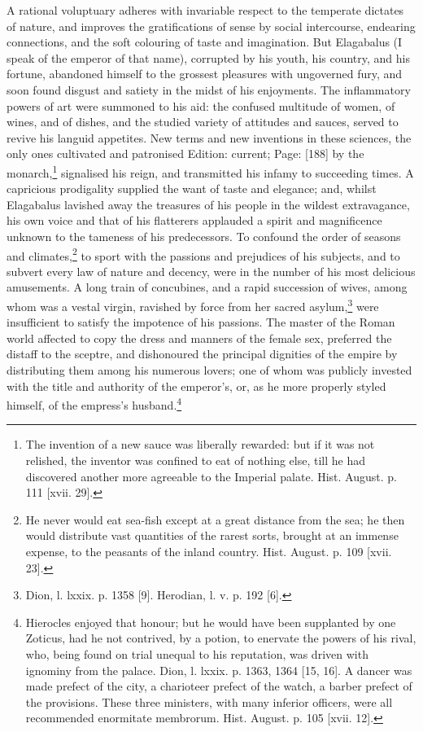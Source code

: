 A rational voluptuary adheres with invariable respect to the temperate dictates of nature, and improves the gratifications of sense by social intercourse, endearing connections, and the soft colouring of taste and imagination. But Elagabalus (I speak of the emperor of that name), corrupted by his youth, his country, and his fortune, abandoned himself to the grossest pleasures with ungoverned fury, and soon found disgust and satiety in the midst of his enjoyments. The inflammatory powers of art were summoned to his aid: the confused multitude of women, of wines, and of dishes, and the studied variety of attitudes and sauces, served to revive his languid appetites. New terms and new inventions in these sciences, the only ones cultivated and patronised Edition: current; Page: [188] by the monarch,\footnote{The invention of a new sauce was liberally rewarded: but if it was not relished, the inventor was confined to eat of nothing else, till he had discovered another more agreeable to the Imperial palate. Hist. August. p. 111 [xvii. 29].} signalised his reign, and transmitted his infamy to succeeding times. A capricious prodigality supplied the want of taste and elegance; and, whilst Elagabalus lavished away the treasures of his people in the wildest extravagance, his own voice and that of his flatterers applauded a spirit and magnificence unknown to the tameness of his predecessors. To confound the order of seasons and climates,\footnote{He never would eat sea-fish except at a great distance from the sea; he then would distribute vast quantities of the rarest sorts, brought at an immense expense, to the peasants of the inland country. Hist. August. p. 109 [xvii. 23].} to sport with the passions and prejudices of his subjects, and to subvert every law of nature and decency, were in the number of his most delicious amusements. A long train of concubines, and a rapid succession of wives, among whom was a vestal virgin, ravished by force from her sacred asylum,\footnote{Dion, l. lxxix. p. 1358 [9]. Herodian, l. v. p. 192 [6].} were insufficient to satisfy the impotence of his passions. The master of the Roman world affected to copy the dress and manners of the female sex, preferred the distaff to the sceptre, and dishonoured the principal dignities of the empire by distributing them among his numerous lovers; one of whom was publicly invested with the title and authority of the emperor\texthebrew{}’s, or, as he more properly styled himself, of the empress\texthebrew{}’s husband.\footnote{Hierocles enjoyed that honour; but he would have been supplanted by one Zoticus, had he not contrived, by a potion, to enervate the powers of his rival, who, being found on trial unequal to his reputation, was driven with ignominy from the palace. Dion, l. lxxix. p. 1363, 1364 [15, 16]. A dancer was made prefect of the city, a charioteer prefect of the watch, a barber prefect of the provisions. These three ministers, with many inferior officers, were all recommended enormitate membrorum. Hist. August. p. 105 [xvii. 12].}

